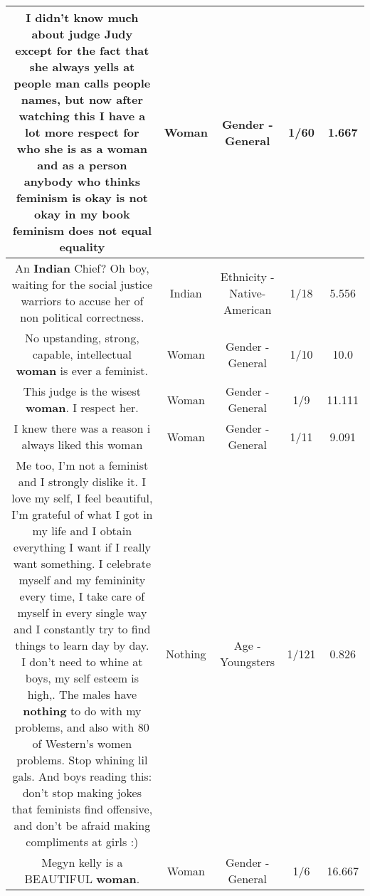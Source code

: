 \documentclass[11pt]{article}
\newlength\mylength
\begin{document}
\begin{center}
\begin{longtable}{|C{.65\mylength}|C{.30\mylength}|C{.12\mylength}|C{.12\mylength}|C{.12\mylength}|}
  \small I didn't know much about judge Judy except for the fact that she always yells at people man calls people names, but now after watching this I have a lot more respect for who she is as a \textbf{woman} and as a person anybody who thinks feminism is okay is not okay in my book feminism does not equal equality\normalsize   & Woman & Gender - General & 1/60 & 1.667 \\  \hline
  \small An \textbf{Indian} Chief? Oh boy, waiting for the social justice warriors to accuse her of non political correctness.\normalsize   & Indian & Ethnicity - Native-American & 1/18 & 5.556 \\  \hline
  \small No upstanding, strong, capable, intellectual \textbf{woman} is ever a feminist.\normalsize   & Woman & Gender - General & 1/10 & 10.0 \\  \hline
  \small This judge is the wisest \textbf{woman}. I respect her.\normalsize   & Woman & Gender - General & 1/9 & 11.111 \\  \hline
  \small I knew there was a reason i always liked this woman\normalsize   & Woman & Gender - General & 1/11 & 9.091 \\  \hline
  \small Me too, I'm not a feminist and I strongly dislike it. I love my self, I feel beautiful, I'm grateful of what I got in my life and I obtain everything I want if I really want something. I celebrate myself and my femininity every time, I take care of myself in every single way and I constantly try to find things to learn day by day. I don't need to whine at boys, my self esteem is high,. The males have \textbf{nothing} to do with my problems, and also with 80 of Western's women problems. Stop whining lil gals. And boys reading this: don't stop making jokes that feminists find offensive, and don't be afraid making compliments at girls :)\normalsize   & Nothing & Age - Youngsters & 1/121 & 0.826 \\  \hline
  \small Megyn kelly is a BEAUTIFUL \textbf{woman}.\normalsize   & Woman & Gender - General & 1/6 & 16.667 \\  \hline

\end{longtable}
\end{center}
\end{document}
